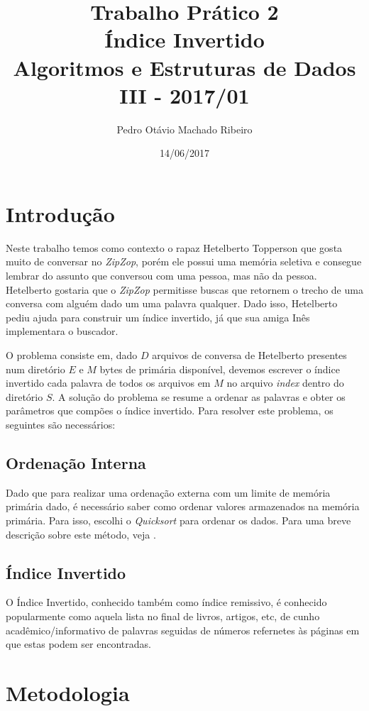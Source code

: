 \documentclass[
	12pt,
	a4paper,
	onepage,
	brazil
]{article}
\author{Pedro Otávio Machado Ribeiro}
\title{Trabalho Prático 2\\Índice Invertido\\Algoritmos e Estruturas de Dados III - 2017/01}
\date{14/06/2017}
\begin{document}
	\maketitle
	
	\section{Introdução}
	
	Neste trabalho temos como contexto o rapaz Hetelberto Topperson que gosta muito de conversar no \textit{ZipZop}, porém ele possui uma memória seletiva e consegue lembrar do assunto que conversou com uma pessoa, mas não da pessoa. Hetelberto gostaria que o \textit{ZipZop} permitisse buscas que retornem o trecho de uma conversa com alguém dado um uma palavra qualquer. Dado isso, Hetelberto pediu ajuda para construir um índice invertido, já que sua amiga Inês implementara o buscador.
	
	O problema consiste em, dado $D$ arquivos de conversa de Hetelberto presentes num diretório $E$ e $M$ bytes de primária disponível, devemos escrever o índice invertido cada palavra de todos os arquivos em $M$ no arquivo \textit{index} dentro do diretório $S$. A solução do problema se resume a ordenar as palavras e obter os parâmetros que compões o índice invertido. Para resolver este problema, os seguintes são necessários:
	
	\subsection{Ordenação Interna}
	
	Dado que para realizar uma ordenação externa com um limite de memória primária dado, é necessário saber como ordenar valores armazenados na memória primária. Para isso, escolhi o \textit{Quicksort} para ordenar os dados. Para uma breve descrição sobre este método, veja \cite{quicksort-wiki}.
	
	\subsection{Índice Invertido}
	
	O Índice Invertido, conhecido também como índice remissivo, é conhecido popularmente como aquela lista no final de livros, artigos, etc, de cunho acadêmico/informativo de palavras seguidas de números refernetes às páginas em que estas podem ser encontradas.
	
	\section{Metodologia}
	
\end{document}

